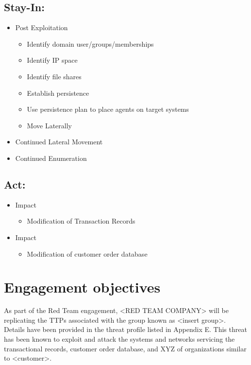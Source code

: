 \documentclass[12pt,letterpaper]{article}
\begin{document}
\subsection{Stay-In:}
\begin{itemize}
    \item Post Exploitation
    \begin{itemize}
        \item Identify domain user/groups/memberships
        \item Identify IP space
        \item Identify file shares
        \item Establish persistence
        \item Use persistence plan to place agents on target systems
        \item Move Laterally
    \end{itemize}
    \item Continued Lateral Movement
    \item Continued Enumeration
\end{itemize}

\subsection{Act:}
\begin{itemize}
    \item Impact
    \begin{itemize}
        \item Modification of Transaction Records
    \end{itemize}
    \item Impact
    \begin{itemize}
        \item Modification of customer order database
    \end{itemize}
\end{itemize}

\section{Engagement objectives}
As part of the Red Team engagement, <RED TEAM COMPANY> will be replicating the TTPs associated with the group known as <insert group>. Details have been provided in the threat profile listed in Appendix E. This threat has been known to exploit and attack the systems and networks servicing the transactional records, customer order database, and XYZ of organizations similar to <customer>.
\end{document}
